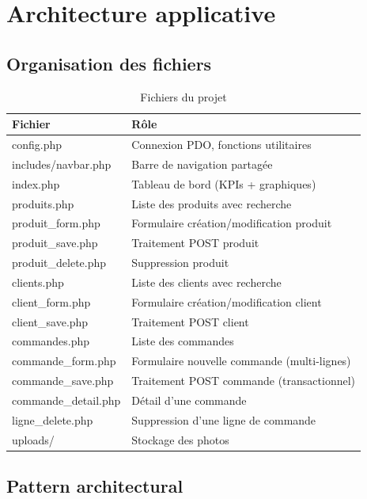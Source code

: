 \documentclass[11pt,a4paper]{article}
\begin{document}
\section{Architecture applicative}

\subsection{Organisation des fichiers}

\begin{table}[h]
\centering
\begin{tabular}{>{\ttfamily}l l}
\toprule
\textbf{Fichier} & \textbf{R\^ole} \\
\midrule
config.php              & Connexion PDO, fonctions utilitaires \\
includes/navbar.php     & Barre de navigation partag\'ee \\
index.php               & Tableau de bord (KPIs + graphiques) \\
produits.php            & Liste des produits avec recherche \\
produit\_form.php       & Formulaire cr\'eation/modification produit \\
produit\_save.php       & Traitement POST produit \\
produit\_delete.php     & Suppression produit \\
clients.php             & Liste des clients avec recherche \\
client\_form.php        & Formulaire cr\'eation/modification client \\
client\_save.php        & Traitement POST client \\
commandes.php           & Liste des commandes \\
commande\_form.php      & Formulaire nouvelle commande (multi-lignes) \\
commande\_save.php      & Traitement POST commande (transactionnel) \\
commande\_detail.php    & D\'etail d'une commande \\
ligne\_delete.php       & Suppression d'une ligne de commande \\
uploads/                & Stockage des photos \\
\bottomrule
\end{tabular}
\caption{Fichiers du projet}
\end{table}

\subsection{Pattern architectural}
\end{document}
